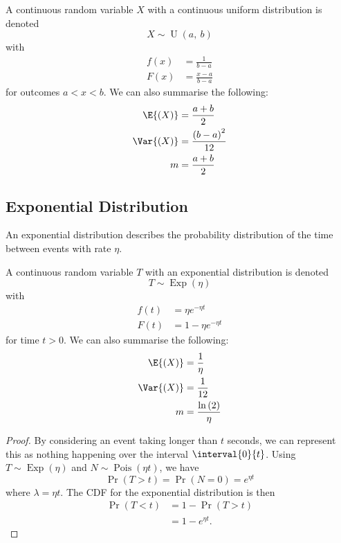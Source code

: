 \documentclass{article}
\begin{document}
A continuous random variable \(X\) with a continuous uniform distribution is denoted
\begin{equation*}
    X \sim \operatorname{U}{\left( a,\: b \right)}
\end{equation*}
with
\begin{align*}
    f\left( x \right) & = \frac{1}{b - a}     \\
    F\left( x \right) & = \frac{x - a}{b - a}
\end{align*}
for outcomes \(a < x < b\).
We can also summarise the following:
\begin{align*}
    \E{\left( X \right)}   & = \frac{a + b}{2}                   \\
    \Var{\left( X \right)} & = \frac{\left( b - a \right)^2}{12} \\
    m                      & = \frac{a + b}{2}
\end{align*}
\subsection{Exponential Distribution}
An exponential distribution describes the probability distribution of the time between events with rate \(\eta\).

A continuous random variable \(T\) with an exponential distribution is denoted
\begin{equation*}
    T \sim \operatorname{Exp}{\left( \eta \right)}
\end{equation*}
with
\begin{align*}
    f\left( t \right) & = \eta e^{-\eta t}     \\
    F\left( t \right) & = 1 - \eta e^{-\eta t}
\end{align*}
for time \(t > 0\).
We can also summarise the following:
\begin{align*}
    \E{\left( X \right)}   & = \frac{1}{\eta}                     \\
    \Var{\left( X \right)} & = \frac{1}{12}                       \\
    m                      & = \frac{\ln{\left( 2 \right)}}{\eta}
\end{align*}
\begin{proof}
    By considering an event taking longer than \(t\) seconds, we can represent this as nothing happening
    over the interval \(\interval{0}{t}\). Using \(T \sim \operatorname{Exp}{\left( \eta \right)}\) and
    \(N \sim \operatorname{Pois}{\left( \eta t \right)}\), we have
    \begin{equation*}
        \Pr{\left( T > t \right)} = \Pr{\left( N = 0 \right)} = e^{\eta t}
    \end{equation*}
    where \(\lambda = \eta t\). The CDF for the exponential distribution is then
    \begin{align*}
        \Pr{\left( T < t \right)} & = 1 - \Pr{\left( T > t \right)} \\
                                  & = 1 - e^{\eta t}.
    \end{align*}
\end{proof}
\end{document}
